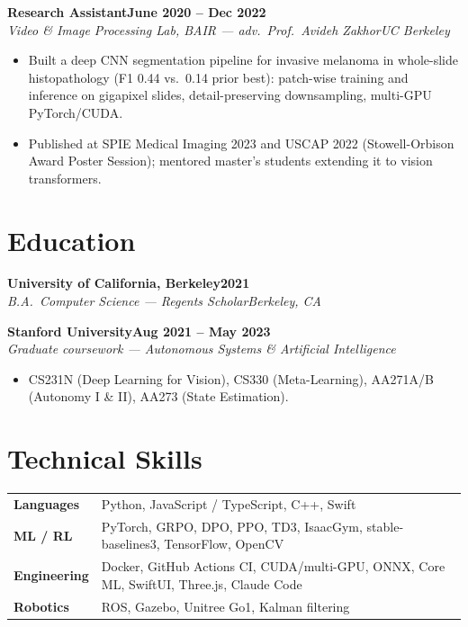 \documentclass[10pt]{article}
\newcommand{\role}[4]{\textbf{#1}\hfill\textbf{#2}\\\textit{#3}\hfill\textit{#4}}
\begin{document}
\role{Research Assistant}{June 2020 -- Dec 2022}{Video \& Image Processing Lab, BAIR --- adv.\ Prof.\ Avideh Zakhor}{UC Berkeley}
\begin{itemize}
\item Built a deep CNN segmentation pipeline for invasive melanoma in whole-slide histopathology (F1 0.44 vs.\ 0.14 prior best): patch-wise training and inference on gigapixel slides, detail-preserving downsampling, multi-GPU PyTorch/CUDA.
\item Published at SPIE Medical Imaging 2023 and USCAP 2022 (Stowell-Orbison Award Poster Session); mentored master's students extending it to vision transformers.
\end{itemize}

\section*{Education}

\role{University of California, Berkeley}{2021}{B.A.\ Computer Science --- Regents Scholar}{Berkeley, CA}

\role{Stanford University}{Aug 2021 -- May 2023}{Graduate coursework --- Autonomous Systems \& Artificial Intelligence}{}
\begin{itemize}
\item CS231N (Deep Learning for Vision), CS330 (Meta-Learning), AA271A/B (Autonomy I \& II), AA273 (State Estimation).
\end{itemize}

\section*{Technical Skills}
\begin{tabular}{@{}p{0.9in}l}
\textbf{Languages} & Python, JavaScript / TypeScript, C++, Swift \\
\textbf{ML / RL} & PyTorch, GRPO, DPO, PPO, TD3, IsaacGym, stable-baselines3, TensorFlow, OpenCV \\
\textbf{Engineering} & Docker, GitHub Actions CI, CUDA/multi-GPU, ONNX, Core ML, SwiftUI, Three.js, Claude Code \\
\textbf{Robotics} & ROS, Gazebo, Unitree Go1, Kalman filtering \\
\end{tabular}
\end{document}
